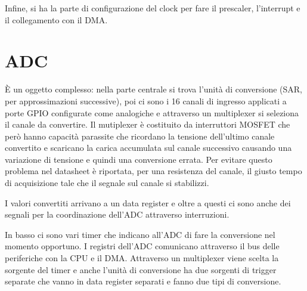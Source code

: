 \documentclass[12pt, a4paper]{report}
\begin{document}
Infine, si ha la parte di configurazione del clock per fare il prescaler, l'interrupt e il collegamento con il DMA.

\section{ADC}
È un oggetto complesso: nella parte centrale si trova l'unità di conversione (SAR, per approssimazioni successive), poi ci sono i 16 canali di ingresso applicati a porte GPIO configurate come analogiche e attraverso un multiplexer si seleziona il canale da convertire. Il mutiplexer è costituito da interruttori MOSFET che però hanno capacità parassite che ricordano la tensione dell'ultimo canale convertito e scaricano la carica accumulata sul canale successivo causando una variazione di tensione e quindi una conversione errata. Per evitare questo problema nel datasheet è riportata, per una resistenza del canale, il giusto tempo di acquisizione tale che il segnale sul canale si stabilizzi.

I valori convertiti arrivano a un data register e oltre a questi ci sono anche dei segnali per la coordinazione dell'ADC attraverso interruzioni.

In basso ci sono vari timer che indicano all'ADC di fare la conversione nel momento opportuno. I registri dell'ADC comunicano attraverso il bus delle periferiche con la CPU e il DMA. Attraverso un multiplexer viene scelta la sorgente del timer e anche l'unità di conversione ha due sorgenti di trigger separate che vanno in data register separati e fanno due tipi di conversione.
\end{document}
